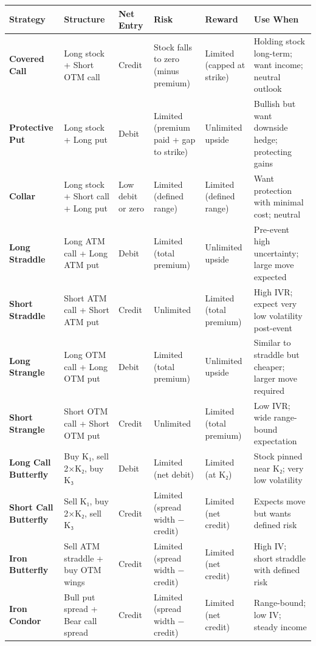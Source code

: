 \documentclass[12pt,openany]{book}
\begin{document}
\begin{center}
\scriptsize
\setlength{\tabcolsep}{3pt}
\begin{tabular}{|L{2.21cm}|L{2.21cm}|L{2.21cm}|L{2.21cm}|L{2.21cm}|L{2.21cm}|}
\hline
Strategy & Structure & Net Entry & Risk & Reward & Use When \\
\hline
\textbf{Covered Call} & Long stock + Short OTM call & Credit & Stock falls to zero (minus premium) & Limited (capped at strike) & Holding stock long-term; want income; neutral outlook \\
\hline
\textbf{Protective Put} & Long stock + Long put & Debit & Limited (premium paid + gap to strike) & Unlimited upside & Bullish but want downside hedge; protecting gains \\
\hline
\textbf{Collar} & Long stock + Short call + Long put & Low debit or zero & Limited (defined range) & Limited (defined range) & Want protection with minimal cost; neutral \\
\hline
\textbf{Long Straddle} & Long ATM call + Long ATM put & Debit & Limited (total premium) & Unlimited upside & Pre-event high uncertainty; large move expected \\
\hline
\textbf{Short Straddle} & Short ATM call + Short ATM put & Credit & Unlimited & Limited (total premium) & High IVR; expect very low volatility post-event \\
\hline
\textbf{Long Strangle} & Long OTM call + Long OTM put & Debit & Limited (total premium) & Unlimited upside & Similar to straddle but cheaper; larger move required \\
\hline
\textbf{Short Strangle} & Short OTM call + Short OTM put & Credit & Unlimited & Limited (total premium) & Low IVR; wide range-bound expectation \\
\hline
\textbf{Long Call Butterfly} & Buy K₁, sell 2×K₂, buy K₃ & Debit & Limited (net debit) & Limited (at K₂) & Stock pinned near K₂; very low volatility \\
\hline
\textbf{Short Call Butterfly} & Sell K₁, buy 2×K₂, sell K₃ & Credit & Limited (spread width − credit) & Limited (net credit) & Expects move but wants defined risk \\
\hline
\textbf{Iron Butterfly} & Sell ATM straddle + buy OTM wings & Credit & Limited (spread width − credit) & Limited (net credit) & High IV; short straddle with defined risk \\
\hline
\textbf{Iron Condor} & Bull put spread + Bear call spread & Credit & Limited (spread width − credit) & Limited (net credit) & Range-bound; low IV; steady income \\
\hline
\end{tabular}
\end{center}
\end{document}
